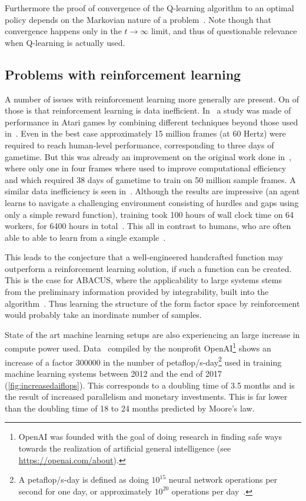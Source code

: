 \documentclass[11pt, a4paper]{report} %
\begin{document}
Furthermore the proof of convergence of the Q-learning algorithm to an optimal policy depends on the Markovian nature of a problem~\cite{watkins92_q_learn}.
Note though that convergence happens only in the \(t\to\infty\) limit, and thus of questionable relevance when Q-learning is actually used.


\subsection{Problems with reinforcement learning}


A number of issues with reinforcement learning more generally are present.
On of those is that reinforcement learning is data inefficient.
In~\cite{1710.02298} a study was made of performance in Atari games by combining different techniques beyond those used in~\cite{mnih13_playin_atari_with_deep_reinf_learn,mnih15_human_level_contr_throug_deep_reinf_learn}.
Even in the best case approximately 15 million frames (at 60 Hertz) were required to reach human-level performance, corresponding to three days of gametime.
But this was already an improvement on the original work done in~\cite{mnih15_human_level_contr_throug_deep_reinf_learn}, where only one in four frames where used to improve computational efficiency and which required 38 days of gametime to train on 50 million sample frames.
A similar data inefficiency is seen in~\cite{heess17_emerg_locom_behav_rich_envir}.
Although the results are impressive (an agent learns to navigate a challenging environment consisting of hurdles and gaps using only a simple reward function), training took 100 hours of wall clock time on 64 workers, for 6400 hours in total~\cite[Figure 1]{heess17_emerg_locom_behav_rich_envir}.
This all in contrast to humans, who are often able to able to learn from a single example~\cite{marcus18_deep_learn}.

This leads to the conjecture that a well-engineered handcrafted function may outperform a reinforcement learning solution, if such a function can be created.
This is the case for ABACUS, where the applicability to large systems stems from the preliminary information provided by integrability, built into the algorithm~\cite{Caux2009}.
Thus learning the structure of the form factor space by reinforcement would probably take an inordinate number of samples.

State of the art machine learning setups are also experiencing an large increase in compute power used.
Data~\cite{amodei2018} compiled by the nonprofit OpenAI\footnote{OpenAI was founded with the goal of doing research in finding safe ways towards the realization of artificial general intelligence (see \href{https://openai.com/about}{https://openai.com/about}).} shows an increase of a factor 300000 in the number of petaflop/s-day\footnote{A petaflop/s-day is defined as doing $10^{15}$ neural network operations per second for one day, or approximately $10^{20}$ operations per day~\cite{amodei2018}.} used in training machine learning systems between 2012 and the end of 2017 (\cref{fig:increasedaiflops}). 
This corresponds to a doubling time of 3.5 months and is the result of increased parallelism and monetary investments.
This is far lower than the doubling time of 18 to 24 months predicted by Moore's law.
\end{document}
